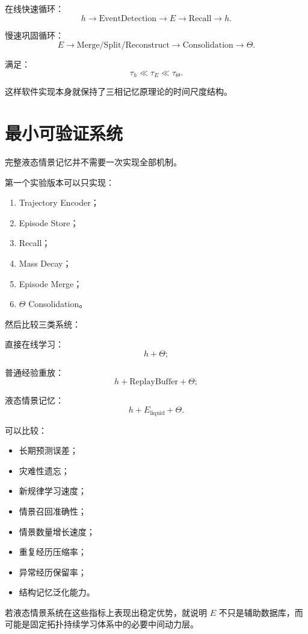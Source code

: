 在线快速循环：
\[
\boxed{
h
\rightarrow
\mathrm{EventDetection}
\rightarrow
E
\rightarrow
\mathrm{Recall}
\rightarrow
h.
}
\]

慢速巩固循环：
\[
\boxed{
E
\rightarrow
\mathrm{Merge/Split/Reconstruct}
\rightarrow
\mathrm{Consolidation}
\rightarrow
\Theta.
}
\]

满足：
\[
\tau_h
\ll
\tau_E
\ll
\tau_\Theta.
\]

这样软件实现本身就保持了三相记忆原理论的时间尺度结构。

\section{最小可验证系统}

完整液态情景记忆并不需要一次实现全部机制。

第一个实验版本可以只实现：

\begin{enumerate}
    \item Trajectory Encoder；
    \item Episode Store；
    \item Recall；
    \item Mass Decay；
    \item Episode Merge；
    \item $\Theta$ Consolidation。
\end{enumerate}

然后比较三类系统：

直接在线学习：
\[
h+\Theta;
\]

普通经验重放：
\[
h+\mathrm{ReplayBuffer}+\Theta;
\]

液态情景记忆：
\[
\boxed{
h+E_{\mathrm{liquid}}+\Theta.
}
\]

可以比较：

\begin{itemize}
    \item 长期预测误差；
    \item 灾难性遗忘；
    \item 新规律学习速度；
    \item 情景召回准确性；
    \item 情景数量增长速度；
    \item 重复经历压缩率；
    \item 异常经历保留率；
    \item 结构记忆泛化能力。
\end{itemize}

若液态情景系统在这些指标上表现出稳定优势，就说明 $E$ 不只是辅助数据库，而可能是固定拓扑持续学习体系中的必要中间动力层。

